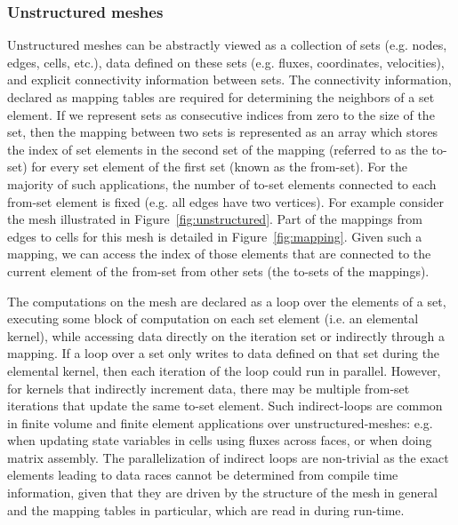 \subsubsection{Unstructured meshes}\label{unstructured-meshes}

\noindent Unstructured meshes can be abstractly viewed as a collection of sets 
(e.g. nodes, edges, cells, etc.), data defined on these sets (e.g. fluxes, 
coordinates, velocities), and explicit connectivity information between 
sets. The connectivity information, declared as mapping tables are required for 
determining the neighbors of a set element. If we represent sets as consecutive 
indices from zero to the size of the set, then the mapping between two 
sets is represented as an array which stores the index of set elements in the 
second set of the mapping (referred to as the to-set) for every set element of 
the first set (known as the from-set). For the majority of such applications, 
the number of to-set elements connected to each from-set element is fixed (e.g. 
all edges have two vertices). For example consider the mesh illustrated 
in Figure~\ref{fig:unstructured}. Part of the mappings from edges to cells for 
this mesh is detailed in Figure~\ref{fig:mapping}. Given such a mapping, we can 
access the index of those elements that are connected to the current element of 
the from-set from other sets (the to-sets of the mappings). 

The computations on the mesh are declared as a loop over the elements of a set, 
executing some block of computation on each set element (i.e. an elemental kernel), 
while accessing data directly on the iteration set or indirectly through a 
mapping.  If a loop over a set only writes to data defined on that set during the 
elemental kernel, then each iteration of the loop could run in parallel. 
However, for kernels that indirectly increment data, there may be multiple 
from-set iterations that update the same to-set element. Such indirect-loops are 
common in finite volume and finite element applications over 
unstructured-meshes: e.g. when updating state variables in cells using fluxes 
across faces, or when doing matrix assembly. The parallelization of indirect 
loops are non-trivial as the exact elements leading to data races cannot be 
determined from compile time information, given that they are driven by the 
structure of the mesh in general and the mapping tables in particular, which are 
read in during run-time. 



